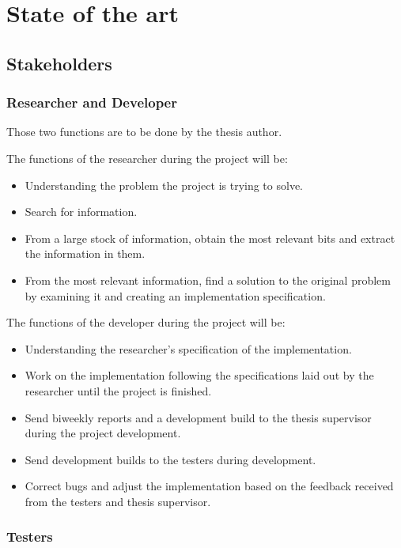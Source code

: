 \section{State of the art}

\subsection{Stakeholders}

\subsubsection{Researcher and Developer}

Those two functions are to be done by the thesis author.

The functions of the researcher during the project will be:

\begin{itemize}
\item Understanding the problem the project is trying to solve.
\item Search for information.
\item From a large stock of information, obtain the most relevant bits and extract the information in them.
\item From the most relevant information, find a solution to the original problem by examining it and creating an implementation specification.
\end{itemize}

The functions of the developer during the project will be:

\begin{itemize}
\item Understanding the researcher's specification of the implementation.
\item Work on the implementation following the specifications laid out by the researcher until the project is finished.
\item Send biweekly reports and a development build to the thesis supervisor during the project development.
\item Send development builds to the testers during development.
\item Correct bugs and adjust the implementation based on the feedback received from the testers and thesis supervisor.
\end{itemize}

\subsubsection{Testers}

